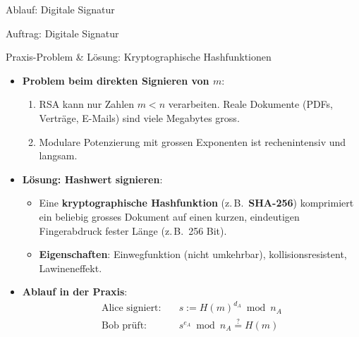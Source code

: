 \begin{frame}{Ablauf: Digitale Signatur}
	\begin{figure}[H]
		\centering
		\resizebox{!}{0.75\textheight}{}
	\end{figure}
\end{frame}

\begin{frame}{Auftrag: Digitale Signatur}
\end{frame}

\begin{frame}{Praxis-Problem \& Lösung: Kryptographische Hashfunktionen}
	\begin{itemize}[<+->]
		\item \textbf{Problem beim direkten Signieren von $m$}:
		      \begin{enumerate}
			      \item RSA kann nur Zahlen $m < n$ verarbeiten. Reale Dokumente (PDFs, Verträge, E-Mails) sind viele Megabytes gross.
			      \item Modulare Potenzierung mit grossen Exponenten ist rechenintensiv und langsam.
		      \end{enumerate}
		\item \textbf{Lösung: Hashwert signieren}:
		      \begin{itemize}
			      \item Eine \textbf{kryptographische Hashfunktion} (z.\,B.\ \textbf{SHA-256}) komprimiert ein beliebig grosses Dokument auf einen kurzen, eindeutigen Fingerabdruck fester Länge (z.\,B.\ 256 Bit).
			      \item \textbf{Eigenschaften}: Einwegfunktion (nicht umkehrbar), kollisionsresistent, Lawineneffekt.
		      \end{itemize}
		\item \textbf{Ablauf in der Praxis}:
		      \begin{align*}
		          \text{Alice signiert:} &\quad s := H(m)^{d_A} \bmod n_A \\
		          \text{Bob prüft:} &\quad s^{e_A} \bmod n_A \stackrel{?}{=} H(m)
		      \end{align*}
	\end{itemize}
\end{frame}

